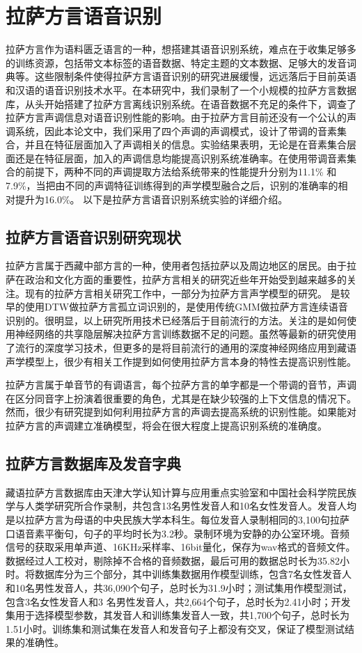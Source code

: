 
\chapter{拉萨方言语音识别}
拉萨方言作为语料匮乏语言的一种，想搭建其语音识别系统，难点在于收集足够多的训练资源，包括带文本标签的语音数据、特定主题的文本数据、足够大的发音词典等。这些限制条件使得拉萨方言语音识别的研究进展缓慢，远远落后于目前英语和汉语的语音识别技术水平。在本研究中，我们录制了一个小规模的拉萨方言数据库，从头开始搭建了拉萨方言离线识别系统。在语音数据不充足的条件下，调查了拉萨方言声调信息对语音识别性能的影响。由于拉萨方言目前还没有一个公认的声调系统，因此本论文中，我们采用了四个声调的声调模式，设计了带调的音素集合，并且在特征层面加入了声调相关的信息。实验结果表明，无论是在音素集合层面还是在特征层面，加入的声调信息均能提高识别系统准确率。在使用带调音素集合的前提下，两种不同的声调提取方法给系统带来的性能提升分别为11.1\% 和7.9\%，当把由不同的声调特征训练得到的声学模型融合之后，识别的准确率的相对提升为16.0\%。 以下是拉萨方言语音识别系统实验的详细介绍。
\section{拉萨方言语音识别研究现状}
拉萨方言属于西藏中部方言的一种，使用者包括拉萨以及周边地区的居民。由于拉萨在政治和文化方面的重要性，拉萨方言相关的研究近些年开始受到越来越多的关注。现有的拉萨方言相关研究工作中，一部分为拉萨方言声学模型的研究。\cite{yao2009research} 是较早的使用DTW做拉萨方言孤立词识别的，\cite{li2012research}\cite{li2014large}是使用传统GMM做拉萨方言连续语音识别的。很明显，以上研究所用技术已经落后于目前流行的方法。\cite{wang2014cross}\cite{zhao2015shared}关注的是如何使用神经网络的共享隐层解决拉萨方言训练数据不足的问题。虽然\cite{wang2014cross}\cite{zhao2015shared}等最新的研究使用了流行的深度学习技术，但更多的是将目前流行的通用的深度神经网络应用到藏语声学模型上，很少有相关工作提到如何使用拉萨方言本身的特性去提高识别性能。

拉萨方言属于单音节的有调语言，每个拉萨方言的单字都是一个带调的音节，声调在区分同音字上扮演着很重要的角色，尤其是在缺少较强的上下文信息的情况下。然而，很少有研究提到如何利用拉萨方言的声调去提高系统的识别性能。如果能对拉萨方言的声调建立准确模型，将会在很大程度上提高识别系统的准确度。
\section{拉萨方言数据库及发音字典}
藏语拉萨方言数据库由天津大学认知计算与应用重点实验室和中国社会科学院民族学与人类学研究所合作录制，共包含13名男性发音人和10名女性发音人。发音人均是以拉萨方言为母语的中央民族大学本科生。每位发音人录制相同的3,100句拉萨口语音素平衡句，句子的平均时长为3.2秒。录制环境为安静的办公室环境。音频信号的获取采用单声道、16KHz采样率、16bit量化，保存为wav格式的音频文件。数据经过人工校对，剔除掉不合格的音频数据，最后可用的数据总时长为35.82小时。将数据库分为三个部分，其中训练集数据用作模型训练，包含7名女性发音人和10名男性发音人，共36,090个句子，总时长为31.9小时；测试集用作模型测试，包含3名女性发音人和3 名男性发音人，共2,664个句子，总时长为2.41小时；开发集用于选择模型参数，其发音人和训练集发音人一致，共1,700个句子，总时长为1.51小时。训练集和测试集在发音人和发音句子上都没有交叉，保证了模型测试结果的准确性。

